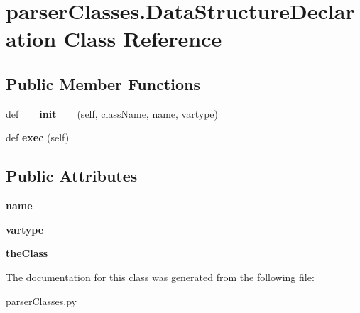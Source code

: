 \hypertarget{classparser_classes_1_1_data_structure_declaration}{}\section{parser\+Classes.\+Data\+Structure\+Declaration Class Reference}
\label{classparser_classes_1_1_data_structure_declaration}
\subsection*{Public Member Functions}
\begin{DoxyCompactItemize}
\item 
\mbox{\label{classparser_classes_1_1_data_structure_declaration_abf31307e4d0cb3dadb9309182def6a2b}} 
def {\bfseries \+\_\+\+\_\+init\+\_\+\+\_\+} (self, class\+Name, name, vartype)
\item 
\mbox{\label{classparser_classes_1_1_data_structure_declaration_ab2fa0b82dbfc8fc1cfc49ba21bf02977}} 
def {\bfseries exec} (self)
\end{DoxyCompactItemize}
\subsection*{Public Attributes}
\begin{DoxyCompactItemize}
\item 
\mbox{\label{classparser_classes_1_1_data_structure_declaration_a72028991597dde706393f738e06687a2}} 
{\bfseries name}
\item 
\mbox{\label{classparser_classes_1_1_data_structure_declaration_adfc5633b6c9fb8292f8c9e59b2c2ab2d}} 
{\bfseries vartype}
\item 
\mbox{\label{classparser_classes_1_1_data_structure_declaration_abfaff3bb31319c434bb7c37702dd2a93}} 
{\bfseries the\+Class}
\end{DoxyCompactItemize}


The documentation for this class was generated from the following file\+:\begin{DoxyCompactItemize}
\item 
parser\+Classes.\+py\end{DoxyCompactItemize}
